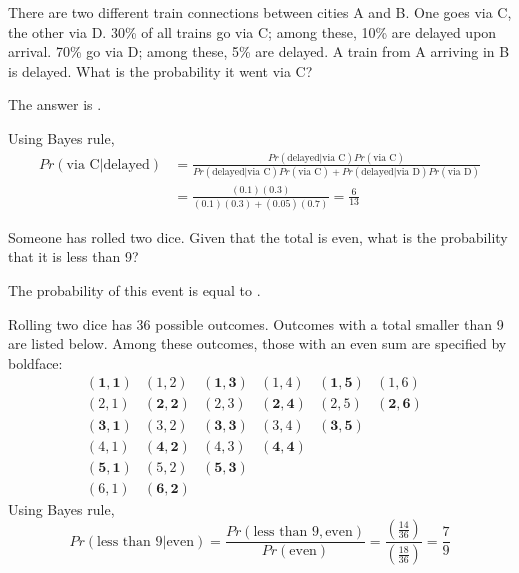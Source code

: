 \documentclass{ximera}
\begin{document}
\begin{question}
There are two different train connections between cities A and B.  One goes via C, the other via D.  30\% of all trains go via C; among these, 10\% are delayed upon arrival.  70\% go via D; among these, 5\% are delayed.   A train from A arriving in B is delayed.  What is the probability it went via C?
\begin{solution}
The answer is .
\end{solution}
Using Bayes rule,
\begin{align*}
Pr (\text{via C} | \text{delayed}) &= \frac{Pr(\text{delayed} | \text{via C}) Pr(\text{via C})}{Pr(\text{delayed} | \text{via C}) Pr(\text{via C}) + Pr(\text{delayed} | \text{via D}) Pr(\text{via D})} \\
& = \frac{(0.1)(0.3)}{(0.1)(0.3) + (0.05)(0.7)} = \frac{6}{13}
\end{align*}
\end{question}

\begin{question}
Someone has rolled two dice.  Given that the total is even, what is the probability that it is less than 9?
\begin{solution}
The probability of this event is equal to .
\end{solution}
Rolling two dice has 36 possible outcomes. Outcomes with a total smaller than 9 are listed below. Among these outcomes, those with an even sum are specified by boldface:
\begin{equation*}
\begin{matrix}
\mathbf{(1,1)} & (1,2) & \mathbf{(1,3)} & (1,4) & \mathbf{(1,5)} & (1,6) \\
(2,1) & \mathbf{(2,2)} & (2,3) & \mathbf{(2,4)} & (2,5) & \mathbf{(2,6)} \\
\mathbf{(3,1)} & (3,2) & \mathbf{(3,3)} & (3,4) & \mathbf{(3,5)} && \\
(4,1) & \mathbf{(4,2)} & (4,3) & \mathbf{(4,4)} &&& \\
\mathbf{(5,1)} & (5,2) & \mathbf{(5,3)} &&&& \\
(6,1) & \mathbf{(6,2)}
\end{matrix}
\end{equation*}
Using Bayes rule,
\begin{equation*}
Pr (\text{less than 9} | \text{even}) = \frac{Pr(\text{less than 9}, \text{even})}{Pr(\text{even})} = \frac{(\frac{14}{36})}{(\frac{18}{36})} = \frac{7}{9}
\end{equation*}
\end{question}
\end{document}
